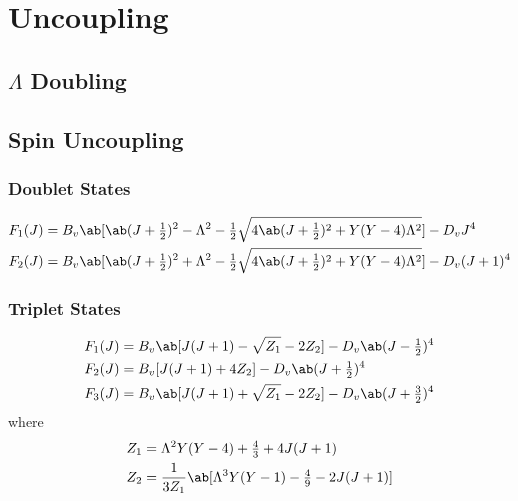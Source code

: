 \chapter{Uncoupling}
\label{c:uncoupling}

\section{\texorpdfstring{$\Lambda$}{Λ} Doubling}
\label{s:lambda_doubling}

\section{Spin Uncoupling}
\label{s:spin_uncoupling}

\subsection{Doublet States}

\begin{align*}
    F_1(J) &= B_v\ab[\ab(J + \tfrac{1}{2})^2 - \Lambda^2 - \tfrac{1}{2}\sqrt{4\ab(J + \tfrac{1}{2})^2 + Y(Y - 4)\Lambda^2}] - D_vJ^4 \\
    F_2(J) &= B_v\ab[\ab(J + \tfrac{1}{2})^2 + \Lambda^2 - \tfrac{1}{2}\sqrt{4\ab(J + \tfrac{1}{2})^2 + Y(Y - 4)\Lambda^2}] - D_v(J + 1)^4
\end{align*}

\subsection{Triplet States}

\begin{align*}
    F_1(J) &= B_v\ab[J(J + 1) - \sqrt{Z_1} - 2Z_2] - D_v\ab(J - \tfrac{1}{2})^4 \\
    F_2(J) &= B_v[J(J + 1) + 4Z_2] - D_v\ab(J + \tfrac{1}{2})^4 \\
    F_3(J) &= B_v\ab[J(J + 1) + \sqrt{Z_1} - 2Z_2] - D_v\ab(J + \tfrac{3}{2})^4
\end{align*}
where
\begin{align*}
    Z_1 &= \Lambda^2Y(Y - 4) + \tfrac{4}{3} + 4J(J + 1) \\
    Z_2 &= \frac{1}{3Z_1}\ab[\Lambda^3Y(Y - 1) - \tfrac{4}{9} - 2J(J + 1)]
\end{align*}
